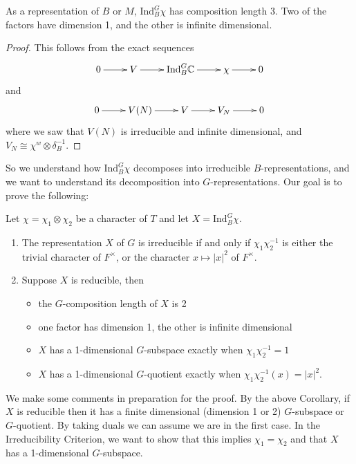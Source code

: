 \begin{cor}\label{length 3}
    As a representation of $B$ or $M$, $\mathrm{Ind}_B^G \chi$ has composition length 3. Two of the factors have dimension 1, and the other is infinite dimensional.
\end{cor}
\begin{proof}
    This follows from the exact sequences
    $$\xymatrix{0 \ar[r] & V \ar[r] & \mathrm{Ind}_B^G \CC \ar[r] & \chi \ar[r] & 0}$$
    and
    $$\xymatrix{0 \ar[r] & V(N) \ar[r] & V \ar[r] & V_N \ar[r] & 0}$$
    where we saw that $V(N)$ is irreducible and infinite dimensional, and $V_N \cong \chi^w \otimes \delta_B^{-1}$.
\end{proof}

So we understand how $\mathrm{Ind}_B^G \chi$ decomposes into irreducible $B$-representations, and we want to understand its decomposition into $G$-representations. Our goal is to prove the following:

\begin{thm}\label{criterion}
    Let $\chi = \chi_1 \otimes \chi_2$ be a character of $T$ and let $X = \mathrm{Ind}_B^G \chi$.
    \begin{enumerate}
        \item The representation $X$ of $G$ is irreducible if and only if $\chi_1\chi_2^{-1}$ is either the trivial character of $F^\times$, or the character $x \mapsto |x|^2$ of $F^\times$.
        \item Suppose $X$ is reducible, then \begin{itemize}
            \item the $G$-composition length of $X$ is 2
            \item one factor has dimension 1, the other is infinite dimensional
            \item $X$ has a 1-dimensional $G$-subspace exactly when $\chi_1\chi_2^{-1}=1$
            \item $X$ has a 1-dimensional $G$-quotient exactly when $\chi_1\chi_2^{-1}(x) = |x|^2$.
        \end{itemize}
    \end{enumerate}
\end{thm}

We make some comments in preparation for the proof. By the above Corollary, if $X$ is reducible then it has a finite dimensional (dimension 1 or 2) $G$-subspace or $G$-quotient. By taking duals we can assume we are in the first case. In the Irreducibility Criterion, we want to show that this implies $\chi_1 = \chi_2$ and that $X$ has a 1-dimensional $G$-subspace.

